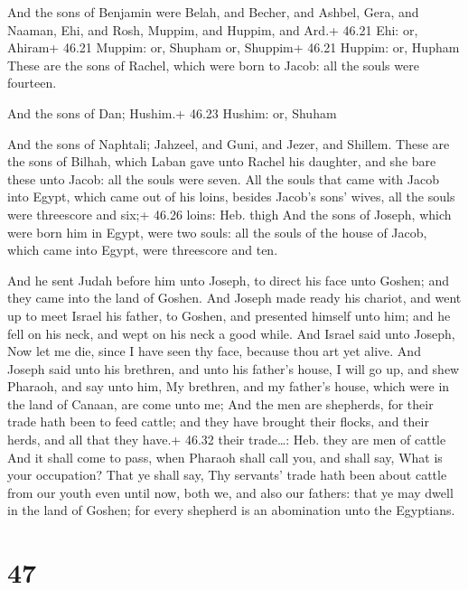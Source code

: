  And the sons of Benjamin were Belah, and Becher, and
Ashbel, Gera, and Naaman, Ehi, and Rosh, Muppim, and Huppim, and Ard.+
46.21 Ehi: or, Ahiram+ 46.21 Muppim: or, Shupham or, Shuppim+ 46.21
Huppim: or, Hupham  These are the sons of Rachel, which
were born to Jacob: all the souls were fourteen.

 And the sons of Dan; Hushim.+ 46.23 Hushim: or, Shuham

 And the sons of Naphtali; Jahzeel, and Guni, and Jezer,
and Shillem.  These are the sons of Bilhah, which Laban
gave unto Rachel his daughter, and she bare these unto Jacob: all the
souls were seven.  All the souls that came with Jacob into
Egypt, which came out of his loins, besides Jacob's sons' wives, all the
souls were threescore and six;+ 46.26 loins: Heb. thigh 
And the sons of Joseph, which were born him in Egypt, were two souls:
all the souls of the house of Jacob, which came into Egypt, were
threescore and ten.

 And he sent Judah before him unto Joseph, to direct his
face unto Goshen; and they came into the land of Goshen. 
And Joseph made ready his chariot, and went up to meet Israel his
father, to Goshen, and presented himself unto him; and he fell on his
neck, and wept on his neck a good while.  And Israel said
unto Joseph, Now let me die, since I have seen thy face, because thou
art yet alive.  And Joseph said unto his brethren, and unto
his father's house, I will go up, and shew Pharaoh, and say unto him, My
brethren, and my father's house, which were in the land of Canaan, are
come unto me;  And the men are shepherds, for their trade
hath been to feed cattle; and they have brought their flocks, and their
herds, and all that they have.+ 46.32 their trade\ldots: Heb. they are
men of cattle  And it shall come to pass, when Pharaoh
shall call you, and shall say, What is your occupation? 
That ye shall say, Thy servants' trade hath been about cattle from our
youth even until now, both we, and also our fathers: that ye may dwell
in the land of Goshen; for every shepherd is an abomination unto the
Egyptians.

\hypertarget{section-46}{%
\section{47}\label{section-46}}

